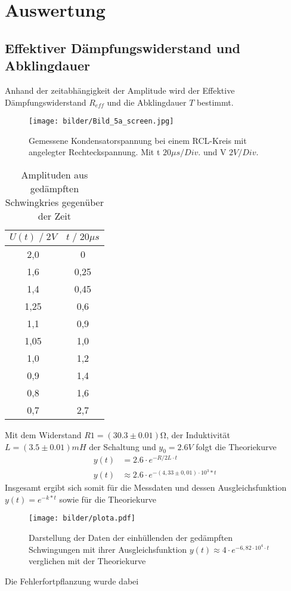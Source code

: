 \newpage
\section{Auswertung}
\subsection{Effektiver Dämpfungswiderstand und Abklingdauer}
Anhand der zeitabhängigkeit der Amplitude wird der Effektive Dämpfungswiderstand $R_{eff}$
und die Abklingdauer $T$ bestimmt. 
\begin{figure}
    \centering
    \texttt{[image: bilder/Bild\_5a\_screen.jpg]}
    \caption{
        Gemessene Kondensatorspannung bei einem RCL-Kreis mit angelegter Rechteckspannung. 
        Mit t $20\mu s/Div.$ und V $ 2V/Div.$
        }
    \label{fig:bild1}
\end{figure}

\begin{table}
    \centering
    \begin{tabular}{c c}
        \toprule
        $U(t)\;/\;2V$ & $t\;/\;20\mu s$\\
        \midrule
        2,0     &0   \\
        1,6     &0,25\\
        1,4     &0,45\\
        1,25    &0,6\\
        1,1     &0,9\\
        1,05    &1,0\\
        1,0     &1,2\\
        0,9     &1,4\\
        0,8     &1,6\\
        0,7     &2,7\\
        \bottomrule
    \end{tabular}
    \caption{Amplituden aus gedämpften Schwingkries gegenüber der Zeit}
    \label{tab:tabelle1}
\end{table}

Mit dem Widerstand $R1=(30.3\pm0.01)\si{\ohm}$, der Induktivität $L=(3.5 \pm 0.01)mH$ der Schaltung und $y_0=2.6V$ folgt die Theoriekurve
\begin{align}
    y(t)&=2.6 \cdot e^{-R/2L \cdot t}\\
    y(t)&\approx 2.6 \cdot e^{-(4,33\pm0,01) \cdot 10^3*t}
\end{align}
\newpage
Insgesamt ergibt sich somit für die Messdaten und dessen Ausgleichsfunktion $y(t)=e^{-k*t}$
sowie für die Theoriekurve
\begin{figure}
    \centering
    \texttt{[image: bilder/plota.pdf]}
    \caption{
        Darstellung der Daten der einhüllenden der gedämpften Schwingungen mit ihrer
        Ausgleichsfunktion $y(t)\approx 4 \cdot e^{-6,82\cdot10^4 \cdot t}$ verglichen mit der Theoriekurve
    }
    \label{fig:ultra_plot}
\end{figure}
Die Fehlerfortpflanzung wurde dabei 




